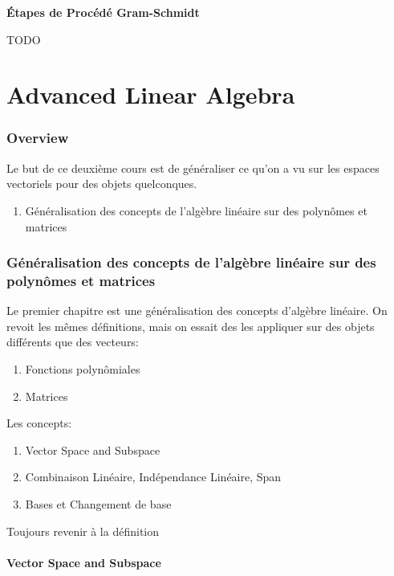 \documentclass{article}
\begin{document}
\textbf{Étapes de Procédé Gram-Schmidt}

TODO

\part{Advanced Linear Algebra} %
\label{prt:Advanced Linear Algebra}


\section{Overview}%
\label{sec:Overview}

Le but de ce deuxième cours est de généraliser ce qu'on a vu sur les
espaces vectoriels pour des objets quelconques.

\begin{enumerate}
    \item Généralisation des concepts de l'algèbre linéaire sur
	des polynômes et matrices
\end{enumerate}

\section{Généralisation des concepts de l'algèbre linéaire sur
	des polynômes et matrices}%
\label{sec:Vector Space and Subspace}

Le premier chapitre est une généralisation des concepts d'algèbre
linéaire. On revoit les mêmes définitions, mais on essait des les
appliquer sur des objets différents que des vecteurs:
\begin{enumerate}
    \item Fonctions polynômiales
    \item Matrices
\end{enumerate}

Les concepts:
\begin{enumerate}
    \item Vector Space and Subspace
    \item Combinaison Linéaire, Indépendance Linéaire, Span
    \item Bases et Changement de base
\end{enumerate}

\begin{remark}
    Toujours revenir à la définition
\end{remark}

\subsection{Vector Space and Subspace}%
\label{sub:Vector Space and Subspace}
\end{document}
